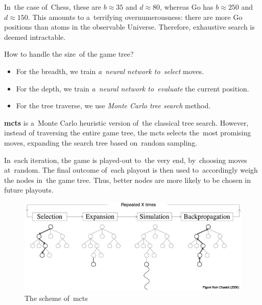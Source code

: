 In~the case of~Chess, these are $b \approx 35$ and $d \approx 80$, whereas Go has $b \approx 250$ and $d \approx 150$.
This amounts to a~terrifying overnumerousness: there are more Go positions than atoms in the observable Universe.
Therefore, exhaustive search is deemed intractable.

How to handle the size~of the game tree?
\begin{itemize}
  \item For the breadth, we train \emph{a~neural network to~select} moves.
  \item For the depth, we train \emph{a~neural network to~evaluate} the current position.
  \item For the tree traverse, we use \emph{Monte Carlo tree search} method.
\end{itemize}

\textbf{\acrfull{mcts}} is a~Monte Carlo heuristic version of~the classical tree search.
However, instead of traversing the entire game tree, the \acrshort{mcts} selects the~most promising moves, expanding the search tree based on~random sampling.

In~each iteration, the game is played-out to~the very end, by~choosing moves at~random.
The final outcome of~each playout is then used to~accordingly weigh the nodes in~the game tree.
Thus, better nodes are more likely to be chosen in future playouts.

\begin{figure}[H]
  \centering
  \includegraphics[width=.6\textwidth]{../img/MCTS.png}
  \caption{The scheme of~\acrshort{mcts}}
  \label{fig:MCTS}
\end{figure}

